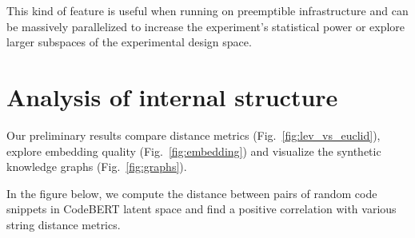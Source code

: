 \documentclass[sigconf,review,anonymous]{acmart}
\begin{document}
  This kind of feature is useful when running on preemptible infrastructure and can be massively parallelized to increase the experiment's statistical power or explore larger subspaces of the experimental design space.

  \pagebreak\section{Analysis of internal structure}\label{sec:probe_internals}

  Our preliminary results compare distance metrics (Fig.~\ref{fig:lev_vs_euclid}), explore embedding quality (Fig.~\ref{fig:embedding}) and visualize the synthetic knowledge graphs (Fig.~\ref{fig:graphs}).

  In the figure below, we compute the distance between pairs of random code snippets in CodeBERT latent space and find a positive correlation with various string distance metrics.
\end{document}
